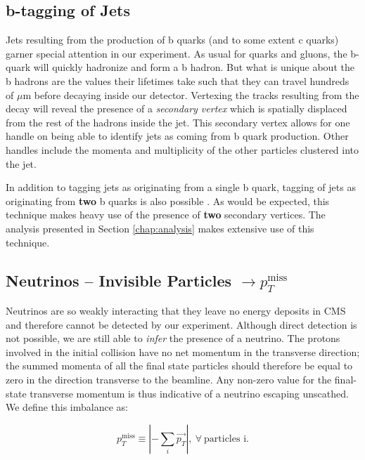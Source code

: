 \subsection{b-tagging of Jets}

Jets resulting from the production of b quarks (and to some extent c quarks) garner special attention in our experiment. As usual for quarks and gluons, the b-quark will quickly hadronize and form a b hadron. But what is unique about the b hadrons are the values their lifetimes take such that they can travel hundreds of $\mu$m before decaying inside our detector. Vertexing the tracks resulting from the decay will reveal the presence of a \textit{secondary vertex} which is spatially displaced from the rest of the hadrons inside the jet. This secondary vertex allows for one handle on being able to identify jets as coming from b quark production. Other handles include the momenta and multiplicity of the other particles clustered into the jet.

In addition to tagging jets as originating from a single b quark, tagging of jets as originating from \textbf{two} b quarks is also possible \cite{bbtagger}. As would be expected, this technique makes heavy use of the presence of \textbf{two} secondary vertices. The analysis presented in Section \ref{chap:analysis} makes extensive use of this technique.

\subsection{Neutrinos -- Invisible Particles $\rightarrow p_{T}^{\mathrm{miss}}$}

Neutrinos are so weakly interacting that they leave no energy deposits in CMS and therefore cannot be detected by our experiment. Although direct detection is not possible, we are still able to \textit{infer} the presence of a neutrino. The protons involved in the initial collision have no net momentum in the transverse direction; the summed momenta of all the final state particles should therefore be equal to zero in the direction transverse to the beamline. Any non-zero value for the final-state transverse momentum is thus indicative of a neutrino escaping unscathed. We define this imbalance as:

\begin{equation}
p_{T}^{\mathrm{miss}}  \equiv \left | - \sum_{i} \vec{p_{T}} \right |,~\forall~\textrm{particles~i}.
\end{equation}

